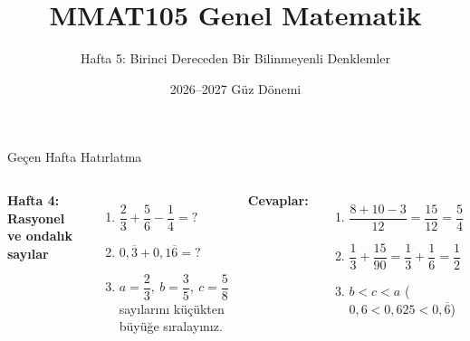 \documentclass[aspectratio=169,11pt]{beamer}
\title[MMAT105 -- Hafta 5]{MMAT105 Genel Matematik}
\subtitle{Hafta 5: Birinci Dereceden Bir Bilinmeyenli Denklemler}
\author{}
\date{2026--2027 Güz Dönemi}
\begin{document}
\begin{frame}
\titlepage
\end{frame}


\begin{frame}{Geçen Hafta Hatırlatma}
\begin{columns}[t]
\textbf{Hafta 4: Rasyonel ve ondalık sayılar}
\begin{enumerate}
\item \(\dfrac{2}{3}+\dfrac{5}{6}-\dfrac{1}{4}=?\)\\[4pt]
\item \(0{,}\overline{3}+0{,}1\overline{6}=?\)\\[4pt]
\item \(a=\dfrac{2}{3},\ b=\dfrac{3}{5},\ c=\dfrac{5}{8}\) sayılarını küçükten büyüğe sıralayınız.
\end{enumerate}
\pause
\textbf{Cevaplar:}
\begin{enumerate}
\item \(\dfrac{8+10-3}{12}=\dfrac{15}{12}=\dfrac{5}{4}\)\\[4pt]
\item \(\dfrac{1}{3}+\dfrac{15}{90}=\dfrac{1}{3}+\dfrac{1}{6}=\dfrac{1}{2}\)\\[4pt]
\item \(b<c<a\) \quad (\(0{,}6<0{,}625<0{,}\overline{6}\))
\end{enumerate}
\end{columns}
\end{frame}
\end{document}
